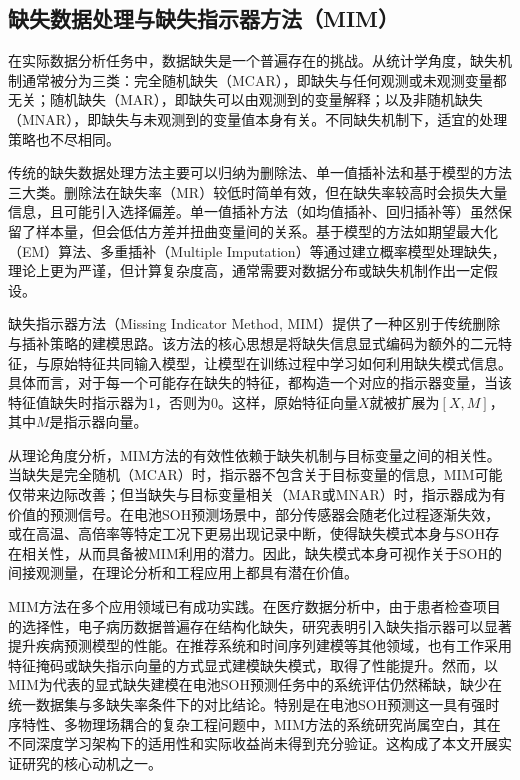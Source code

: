 \documentclass[10pt,a4paper]{ctexart}
\begin{document}
\subsection{缺失数据处理与缺失指示器方法（MIM）}

在实际数据分析任务中，数据缺失是一个普遍存在的挑战。从统计学角度，缺失机制通常被分为三类：完全随机缺失（MCAR），即缺失与任何观测或未观测变量都无关；随机缺失（MAR），即缺失可以由观测到的变量解释；以及非随机缺失（MNAR），即缺失与未观测到的变量值本身有关\cite{little2002statistical}。不同缺失机制下，适宜的处理策略也不尽相同。

传统的缺失数据处理方法主要可以归纳为删除法、单一值插补法和基于模型的方法三大类。删除法在缺失率（MR）较低时简单有效，但在缺失率较高时会损失大量信息，且可能引入选择偏差。单一值插补方法（如均值插补、回归插补等）虽然保留了样本量，但会低估方差并扭曲变量间的关系。基于模型的方法如期望最大化（EM）算法、多重插补（Multiple Imputation）等通过建立概率模型处理缺失，理论上更为严谨，但计算复杂度高，通常需要对数据分布或缺失机制作出一定假设。

缺失指示器方法（Missing Indicator Method, MIM）提供了一种区别于传统删除与插补策略的建模思路\cite{jones1996indicator,van2023missing}。该方法的核心思想是将缺失信息显式编码为额外的二元特征，与原始特征共同输入模型，让模型在训练过程中学习如何利用缺失模式信息\cite{ipsen2022deal}。具体而言，对于每一个可能存在缺失的特征，都构造一个对应的指示器变量，当该特征值缺失时指示器为1，否则为0。这样，原始特征向量$X$就被扩展为$[X, M]$，其中$M$是指示器向量。

从理论角度分析，MIM方法的有效性依赖于缺失机制与目标变量之间的相关性。当缺失是完全随机（MCAR）时，指示器不包含关于目标变量的信息，MIM可能仅带来边际改善；但当缺失与目标变量相关（MAR或MNAR）时，指示器成为有价值的预测信号。在电池SOH预测场景中，部分传感器会随老化过程逐渐失效，或在高温、高倍率等特定工况下更易出现记录中断，使得缺失模式本身与SOH存在相关性，从而具备被MIM利用的潜力。因此，缺失模式本身可视作关于SOH的间接观测量，在理论分析和工程应用上都具有潜在价值。

MIM方法在多个应用领域已有成功实践。在医疗数据分析中，由于患者检查项目的选择性，电子病历数据普遍存在结构化缺失，研究表明引入缺失指示器可以显著提升疾病预测模型的性能\cite{sisk2023imputation,ehrig2025imputation}。在推荐系统和时间序列建模等其他领域，也有工作采用特征掩码或缺失指示向量的方式显式建模缺失模式，取得了性能提升\cite{ipsen2022deal,che2018recurrent}。然而，以MIM为代表的显式缺失建模在电池SOH预测任务中的系统评估仍然稀缺，缺少在统一数据集与多缺失率条件下的对比结论。特别是在电池SOH预测这一具有强时序特性、多物理场耦合的复杂工程问题中，MIM方法的系统研究尚属空白，其在不同深度学习架构下的适用性和实际收益尚未得到充分验证。这构成了本文开展实证研究的核心动机之一。
\end{document}
